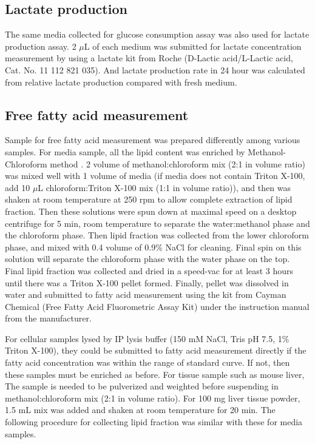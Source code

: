 \subsection{Lactate production} 

The same media collected for glucose consumption assay was also used for lactate production assay. 2 $\mu$L of each medium was submitted for lactate concentration measurement by using a lactate kit from Roche (D-Lactic acid/L-Lactic acid, Cat. No. 11 112 821 035). And lactate production rate in 24 hour was calculated from relative lactate production compared with fresh medium.

\subsection{Free fatty acid measurement}

Sample for free fatty acid measurement was prepared differently among various samples. For media sample, all the lipid content was enriched by Methanol-Chloroform method  \cite{folch_simple_1957}. 2 volume of methanol:chloroform mix (2:1 in volume ratio) was mixed well with 1 volume of media (if media does not contain Triton X-100, add 10 $\mu$L chloroform:Triton X-100 mix (1:1 in volume ratio)), and then was shaken at room temperature at 250 rpm to allow complete extraction of lipid fraction. Then these solutions were spun down at maximal speed on a desktop centrifuge for 5 min, room temperature to separate the water:methanol phase and the chloroform phase. Then lipid fraction was collected from the lower chloroform phase, and mixed with 0.4 volume of 0.9\% NaCl for cleaning. Final spin on this solution will separate the chloroform phase with the water phase on the top. Final lipid fraction was collected and dried in a speed-vac for at least 3 hours until there was a Triton X-100 pellet formed. Finally, pellet was dissolved in water and submitted to fatty acid measurement using the kit from Cayman Chemical (Free Fatty Acid Fluorometric Assay Kit) under the instruction manual from the manufacturer. 

For cellular samples lysed by IP lysis buffer (150 mM NaCl, Tris pH 7.5, 1\% Triton X-100), they could be submitted to fatty acid measurement directly if the fatty acid concentration was within the range of standard curve. If not, then these samples must be enriched as before. For tissue sample such as mouse liver, The sample is needed to be pulverized and weighted before suspending in methanol:chloroform mix (2:1 in volume ratio). For 100 mg liver tissue powder, 1.5 mL mix was added and shaken at room temperature for 20 min. The following procedure for collecting lipid fraction was similar with these for media samples.

